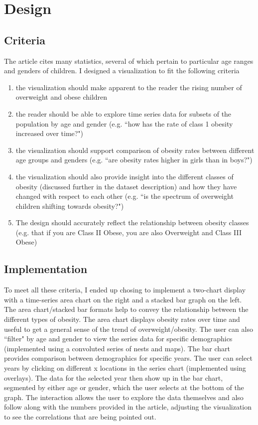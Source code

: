 \documentclass{article}
\begin{document}
\section{Design}

\subsection{Criteria}


The article cites many statistics, several of which pertain to particular age ranges and genders of children.  I designed a visualization to fit the following criteria

\begin{enumerate}
    \item the visualization should make apparent to the reader the rising number of overweight and obese children
    \item the reader should be able to explore time series data for subsets of the population by age and gender (e.g. ``how has the rate of class 1 obesity increased over time?")
    \item the visualization should support comparison of obesity rates between different age groups and genders (e.g. ``are obesity rates higher in girls than in boys?")
    \item the visualization should also provide insight into the different classes of obesity (discussed further in the dataset description) and how they have changed with respect to each other (e.g. ``is the spectrum of overweight children shifting towards obesity?")
    \item The design should accurately reflect the relationship between obesity classes (e.g. that if you are Class II Obese, you are also Overweight and Class III Obese)
\end{enumerate}

\subsection{Implementation}


To meet all these criteria, I ended up chosing to implement a two-chart display with a time-series area chart on the right and a stacked bar graph on the left.  The area chart/stacked bar formats help to convey the relationship between the different types of obesity.  The area chart displays obesity rates over time and useful to get a general sense of the trend of overweight/obesity.  The user can also ``filter" by age and gender to view the series data for specific demographics (implemented using a convoluted series of nests and maps).  The bar chart provides comparison between demographics for specific years.  The user can select years by clicking on different x locations in the series chart (implemented using overlays).  The data for the selected year then show up in the bar chart, segmented by either age or gender, which the user selects at the bottom of the graph.   The interaction allows the user to explore the data themselves and also follow along with the numbers provided in the article, adjusting the visualization to see the correlations that are being pointed out.
\end{document}
